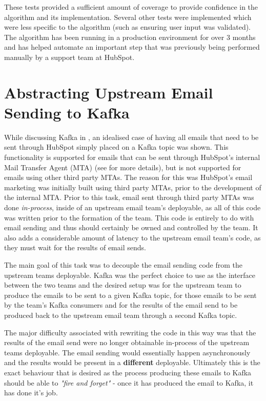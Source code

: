 These tests provided a sufficient amount of coverage to provide confidence in the algorithm and its implementation. Several other tests were implemented which were less specific to the algorithm (such as ensuring user input was validated). The algorithm has been running in a production environment for over 3 months and has helped automate an important step that was previously being performed manually by a support team at HubSpot.   

\section{Abstracting Upstream Email Sending to Kafka}
While discussing Kafka in , an idealised case of having all emails that need to be sent through HubSpot simply placed on a Kafka topic was shown. This functionality is supported for emails that can be sent through HubSpot's internal Mail Transfer Agent (MTA) (see  for more details), but is not supported for emails using other third party MTAs. The reason for this was HubSpot's email marketing was initially built using third party MTAs, prior to the development of the internal MTA. Prior to this task, email sent through third party MTAs was done \textit{in-process}, inside of an upstream email team's deployable, as all of this code was written prior to the formation of the \team{} team. This code is entirely to do with email sending and thus should certainly be owned and controlled by the \team{} team. It also adds a considerable amount of latency to the upstream email team's code, as they must wait for the results of email sends. 

The main goal of this task was to decouple the email sending code from the upstream teams deployable. Kafka was the perfect choice to use as the interface between the two teams and the desired setup was for the upstream team to produce the emails to be sent to a given Kafka topic, for those emails to be sent by the \team{} team's Kafka consumers and for the results of the email send to be produced back to the upstream email team through a second Kafka topic.

The major difficulty associated with rewriting the code in this way was that the results of the email send were no longer obtainable in-process of the upstream teams deployable. The email sending would essentially happen asynchronously and the results would be present in a \textbf{different} deployable. Ultimately this is the exact behaviour that is desired as the process producing these emails to Kafka should be able to \textit{"fire and forget"} - once it has produced the email to Kafka, it has done it's job.


